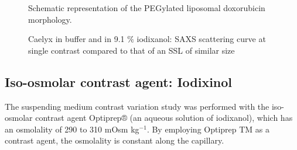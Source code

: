 \begin{figure}
	\centering
		\caption{ Schematic representation of the PEGylated liposomal doxorubicin morphology.}
\end{figure}

\begin{figure}
	\centering
		
		\caption{Caelyx in buffer and in 9.1 $\%$ iodixanol: SAXS scattering curve at single contrast compared to that of an SSL of similar size}
		\label{fig:CaelyxIodixanolSingleContrast}
\end{figure}

\subsection{Iso-osmolar contrast agent: Iodixinol}

The suspending medium contrast variation study was performed with the iso-osmolar contrast agent Optiprep® (an aqueous solution of iodixanol), which has an osmolality of 290 to 310 mOsm kg$^{-1}$. By employing Optiprep TM as a contrast agent, the osmolality is constant along the capillary. 

